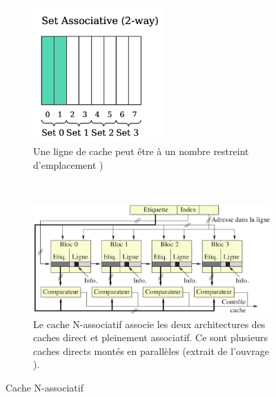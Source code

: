 \begin{figure}
                   \vspace*{\floatsep}%

                \centering
                \begin{subfigure}[b]{0.35\linewidth}
                    \includegraphics[width=5cm]{images/cache_asso_2way.png}
                    \caption{Une ligne de cache peut être à un nombre restreint d'emplacement \cite{Meunier2017})}
                    \label{pic:cache_asso_2way}
                \end{subfigure}
                ~ %
                \begin{subfigure}[b]{0.60\linewidth}
                    \includegraphics[width=\linewidth]{images/cache_circuit-set-associative.png}
                    \caption{Le cache N-associatif associe les deux architectures des caches direct et pleinement associatif. Ce sont plusieurs caches directs montés en parallèles (extrait de l'ouvrage \cite{Blanchet2013}).}
                    \label{pic:cache_circuit-set-associative}
                \end{subfigure}
                \caption{Cache N-associatif}\label{pic:cachemappage_setasso}
        \end{figure}
       
